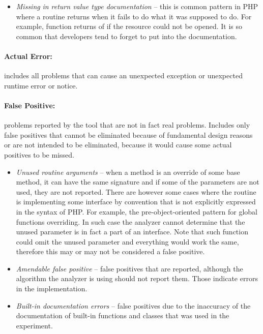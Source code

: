 \begin{itemize}
    \item[] \textit{Missing}  \textit{in return value type documentation} -- 
        this is common pattern in PHP where a routine returns  
        when it fails to do what it was supposed to do. For example, 
        function  returns  of  
        if the resource could not be opened. It is so common that 
        developers tend to forget to put  into the documentation.
\end{itemize}

\paragraph*{Actual Error:} includes all problems that can cause 
an unexpected exception or unexpected runtime error or notice.


\paragraph*{False Positive:} problems reported by the tool that 
are not in fact real problems. Includes only false positives 
that cannot be eliminated because of fundamental design reasons 
or are not intended to be eliminated, because it would 
cause some actual positives to be missed.


\begin{itemize}
    \item[] \textit{Unused routine arguments} -- when a method is an override of 
        some base method, it can have the same signature and if some of the 
        parameters are not used, they are not reported. There are however 
        some cases where the routine is implementing some interface by convention 
        that is not explicitly expressed in the syntax of PHP.
        For example, the pre-object-oriented pattern for global functions 
        overriding. In such case the analyzer cannot determine that the unused 
        parameter is in fact a part of an interface. Note that such function 
        could omit the unused parameter and everything would work the same, 
        therefore this may or may not be considered a false positive.
    \item[] \textit{Amendable false positive} -- false positives 
        that are reported, although the algorithm the analyzer 
        is using should not report them. Those indicate errors 
        in the implementation.
    \item[] \textit{Built-in documentation errors} -- false positives 
        due to the inaccuracy of the documentation of built-in 
        functions and classes that was used in the experiment.
\end{itemize}

